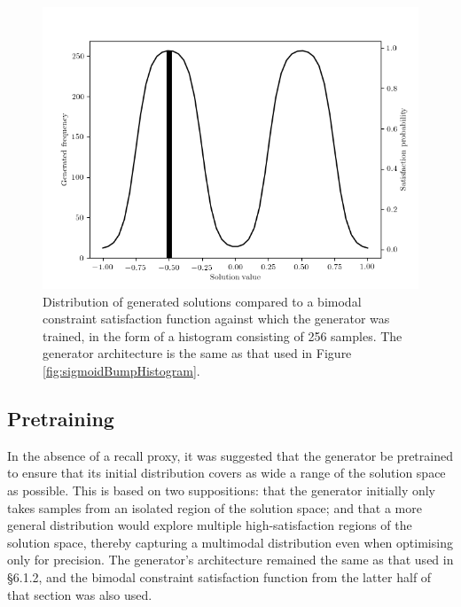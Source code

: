 \documentclass[../../main.tex]{subfiles}
\begin{document}
\begin{figure}[H]
    \begin{center}
    \includegraphics[width=\textwidth]{sigmoidBumpHistogramBimodal}
    \caption{
        Distribution of generated solutions compared to a bimodal constraint satisfaction function against which the generator was trained, in the form of a histogram consisting of 256 samples.
        The generator architecture is the same as that used in Figure \ref{fig:sigmoidBumpHistogram}.
    }
    \label{fig:sigmoidBumpHistogramBimodal}
    \end{center}
\end{figure}

\subsection{Pretraining}

In the absence of a recall proxy, it was suggested that the generator be pretrained to ensure that its initial distribution covers as wide a range of the solution space as possible.
This is based on two suppositions: that the generator initially only takes samples from an isolated region of the solution space; and that a more general distribution would explore multiple high-satisfaction regions of the solution space, thereby capturing a multimodal distribution even when optimising only for precision.
The generator's architecture remained the same as that used in \S 6.1.2, and the bimodal constraint satisfaction function from the latter half of that section was also used.
\end{document}
